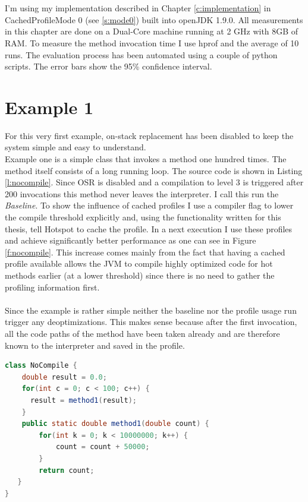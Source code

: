 \\\\
I'm using my implementation described in Chapter \ref{c:implementation} in CachedProfileMode 0 (see \ref{s:mode0}) built into openJDK 1.9.0.
All measurements in this chapter are done on a Dual-Core machine running at 2 GHz with 8GB of RAM. To measure the method invocation time I use hprof \cite{hprof} and the average of 10 runs. The evaluation process has been automated using a couple of python scripts. The error bars show the 95\% confidence interval.
\section{Example 1}
\label{s:ex1}
For this very first example, on-stack replacement has been disabled to keep the system simple and easy to understand.
\\
Example one is a simple class that invokes a method one hundred times. The method itself consists of a long running loop. The source code is shown in Listing \ref{l:nocompile}.
Since OSR is disabled and a compilation to level 3 is triggered after 200 invocations this method never leaves the interpreter. I call this run the \textit{Baseline}.
To show the influence of cached profiles I use a compiler flag to lower the compile threshold explicitly and, using the functionality written for this thesis, tell Hotspot to cache the profile.
In a next execution I use these profiles and achieve significantly better performance as one can see in Figure \ref{f:nocompile}.
This increase comes mainly from the fact that having a cached profile available allows the JVM to compile highly optimized code for hot methods earlier (at a lower threshold) since there is no need to gather the profiling information first.
\\\\
Since the example is rather simple neither the baseline nor the profile usage run trigger any deoptimizations. This makes sense because after the first invocation, all the code paths of the method have been taken already and are therefore known to the interpreter and saved in the profile.
\begin{lstlisting}[float,caption=Simple method that does not get compiled,label=l:nocompile,language=Java]
class NoCompile {
    double result = 0.0;
    for(int c = 0; c < 100; c++) {
      result = method1(result);
    }
    public static double method1(double count) {
        for(int k = 0; k < 10000000; k++) {
            count = count + 50000;
        }
        return count;
   }
}
\end{lstlisting}

